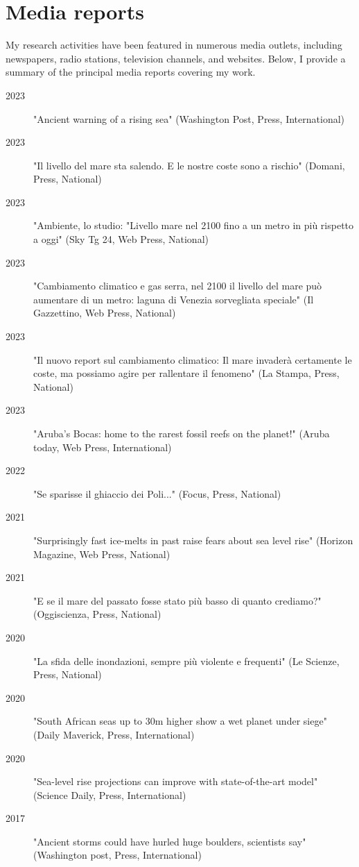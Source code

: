 \documentclass[11pt]{article}
\begin{document}
\newpage
\section{Media reports}
{\normalfont My research activities have been featured in numerous media outlets, including newspapers, radio stations, television channels, and websites. Below, I provide a summary of the principal media reports covering my work.}\\
{\footnotesize 
\begin{description}
  \item [2023] "Ancient warning of a rising sea" (Washington Post, Press, International)
  \item [2023] "Il livello del mare sta salendo. E le nostre coste sono a rischio" (Domani, Press, National) 
  \item [2023] "Ambiente, lo studio: "Livello mare nel 2100 fino a un metro in più rispetto a oggi" (Sky Tg 24, Web Press, National) 
   \item [2023] "Cambiamento climatico e gas serra, nel 2100 il livello del mare può aumentare di un metro: laguna di Venezia sorvegliata speciale" (Il Gazzettino, Web Press, National) 
  \item [2023] "Il nuovo report sul cambiamento climatico: Il mare invaderà certamente le coste, ma possiamo agire per rallentare il fenomeno" (La Stampa, Press, National) 
  \item [2023] "Aruba’s Bocas: home to the rarest fossil reefs on the planet!" (Aruba today, Web Press, International) 
  \item [2022] "Se sparisse il ghiaccio dei Poli..." (Focus, Press, National) 
  \item [2021] "Surprisingly fast ice-melts in past raise fears about sea level rise" (Horizon Magazine, Web Press, National) 
  \item [2021] "E se il mare del passato fosse stato più basso di quanto crediamo?" (Oggiscienza, Press, National) 
  \item [2020] "La sfida delle inondazioni, sempre più violente e frequenti" (Le Scienze, Press, National) 
  \item [2020] "South African seas up to 30m higher show a wet planet under siege" (Daily Maverick, Press, International) 
  \item [2020] "Sea-level rise projections can improve with state-of-the-art model" (Science Daily, Press, International) 
  \item [2017] "Ancient storms could have hurled huge boulders, scientists say" (Washington post, Press, International) 

\end{description}}
\end{document}
